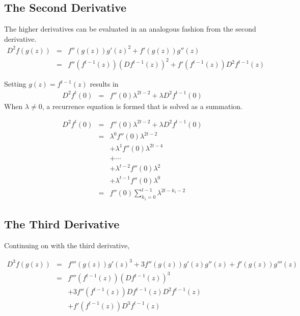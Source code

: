 \documentclass{article}
\theoremstyle{definition}
\begin{document}
\subsection{The Second Derivative}  

The higher derivatives can be evaluated in an analogous fashion from the second derivative.
\begin{eqnarray}
  D^2f(g(z))&=&f''(g(z))g'(z)^2+f'(g(z))g''(z) \nonumber\\
          &=&f''(f^{t-1}(z))(Df^{t-1}(z))^2+f'(f^{t-1}(z))D^2f^{t-1}(z)
\end{eqnarray}

Setting $g(z) = f^{t-1}(z)$ results in
\begin{eqnarray}        
 D^2f^t(0)&=& f''(0) \lambda^{2t-2}+\lambda D^2f^{t-1}(0)\nonumber
\end{eqnarray}
When $\lambda \neq 0$, a recurrence equation is formed that is solved as a summation. 

\begin{eqnarray}             
 D^2f^t(0)&=&f''(0)\lambda^{2t-2}+\lambda D^2f^{t-1}(0)\nonumber\\
            &=&\lambda^0f''(0) \lambda^{2t-2}\nonumber\\
            &&+\lambda^1f''(0) \lambda^{2t-4}\nonumber\\
            &&+\cdots\nonumber\\
            &&+\lambda^{t-2}f''(0) \lambda^2\nonumber\\
            &&+\lambda^{t-1}f''(0) \lambda^0\nonumber\\
            &=&f''(0)\sum_{k_1=0}^{t-1}\lambda^{2t-k_1-2}
 \label{eq:TheSecondDerivative}            
\end{eqnarray}



\subsection{The Third Derivative}
\label{sec:TheThirdDerivative}
Continuing on with the third derivative,

\begin{eqnarray}
	D^3f(g(z))&=&f'''(g(z))g'(z)^3+3f''(g(z))g'(z)g''(z)+f'(g(z))g'''(z)\nonumber\\
	          &=&f'''(f^{t-1}(z))(Df^{t-1}(z))^3\nonumber\\
	           &&+3f''(f^{t-1}(z))Df^{t-1}(z)D^2f^{t-1}(z)\nonumber\\
	           &&+f'(f^{t-1}(z))D^3f^{t-1}(z)\nonumber
\end{eqnarray}
\end{document}
